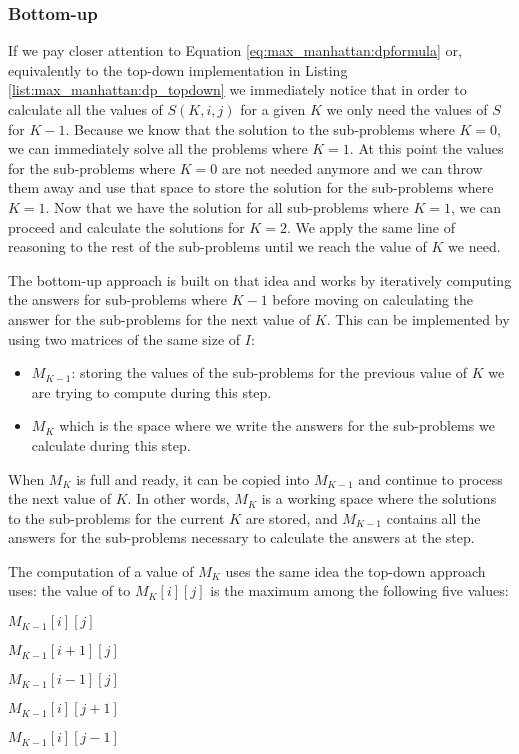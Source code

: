 \subsubsection{Bottom-up}
If we pay closer attention to Equation \ref{eq:max_manhattan:dpformula} or, equivalently to the
top-down implementation in Listing \ref{list:max_manhattan:dp_topdown} we immediately notice that in
order to calculate all the values of $S(K,i,j)$ for a given $K$ we only need the values of $S$ for
$K-1$. Because we know that the solution to the sub-problems where $K=0$, we can immediately solve
all the problems where $K=1$. At this point the values for the sub-problems where $K=0$ are not
needed anymore and we can throw them away and use that space to store the solution for the
sub-problems where $K=1$. Now that we have the solution for all sub-problems where $K=1$, we can proceed and calculate the
solutions for $K=2$. We apply the same line of reasoning to the rest of the sub-problems
 until we reach the value of $K$ we need.

The bottom-up approach is built on that idea and works by iteratively computing the answers for
sub-problems where $K-1$ before moving on calculating the answer for the sub-problems for the next
value of $K$. This can be implemented by using two matrices of the same size of $I$:
\begin{itemize}
    \item $M_{K-1}$: storing the values of the sub-problems for the previous value of $K$ we are
    trying to compute during this step.
    \item $M_{K}$ which is the space where we write the answers for the sub-problems we calculate
    during this step.
\end{itemize}
When $M_{K}$ is full and ready, it can be copied into $M_{K-1}$ and continue to process the next
value of $K$. In other words, $M_{K}$ is a working space where the solutions to the sub-problems for
the current $K$ are stored, and $M_{K-1}$ contains all the answers for the sub-problems necessary to
calculate the answers at the step.

The computation of a value of $M_{K}$ uses the same idea the top-down approach uses: the value of
to $M_K[i][j]$ is the maximum  among the following five values: 
\begin{enumerate*}
    \item $M_{K-1}[i][j]$
    \item $M_{K-1}[i+1][j]$
    \item $M_{K-1}[i-1][j]$
    \item $M_{K-1}[i][j+1]$
    \item $M_{K-1}[i][j-1]$
\end{enumerate*}

